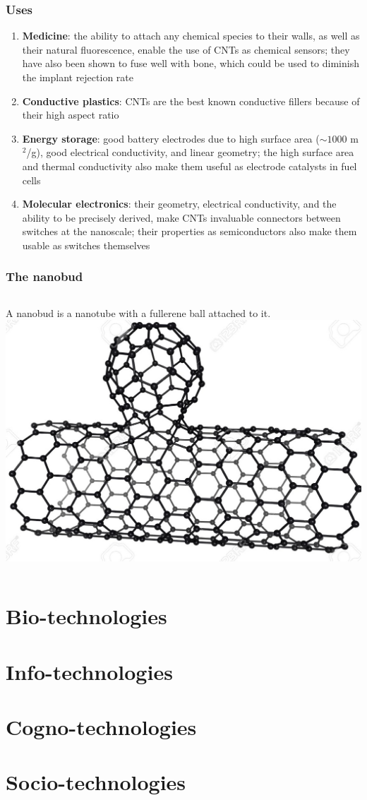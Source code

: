 \documentclass{beamer}
\begin{document}
\begin{frame}
	\frametitle{Uses}
	\begin{enumerate}
	\item \textbf{Medicine}: the ability to attach any chemical species to their walls, as well as their natural fluorescence, enable the use of CNTs as chemical sensors; they have also been shown to fuse well with bone, which could be used to diminish the implant rejection rate
	\item \textbf{Conductive plastics}: CNTs are the best known conductive fillers because of their high aspect ratio
	\item \textbf{Energy storage}: good battery electrodes due to high surface area ($\sim 1000$ m$^2$/g), good electrical conductivity, and linear geometry; the high surface area and thermal conductivity also make them useful as electrode catalysts in fuel cells
	\item \textbf{Molecular electronics}: their geometry, electrical conductivity, and the ability to be precisely derived, make CNTs invaluable connectors between switches at the nanoscale; their properties as semiconductors also make them usable as switches themselves
	\end{enumerate}
\end{frame}

\begin{frame}
	\frametitle{The nanobud}
	\begin{columns}
			A nanobud is a nanotube with a fullerene ball attached to it.
			\includegraphics[scale=.15]{Nanobud}
	\end{columns}
\end{frame}

\section{Bio-technologies}

\section{Info-technologies}

\section{Cogno-technologies}

\section{Socio-technologies}
\end{document}

